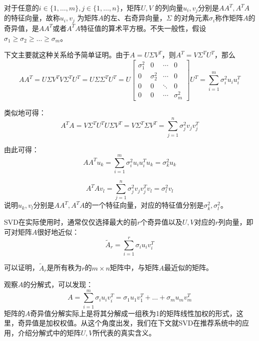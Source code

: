 对于任意的$i\in\{1,\ldots,m\},j\in\{1,\ldots,n\}$，矩阵$U,V$ 的列向量$u_i,v_j$分别是$AA^T,A^TA$ 的特征向量，故称$u_i,v_j$ 为矩阵$A$的左、右奇异向量，$\Sigma$ 的对角元素$\sigma_i$称作矩阵$A$的奇异值，是$AA^T$或者$A^TA$特征值的算术平方根。不失一般性，假设$\sigma_1 \ge \sigma_2 \ge \ldots \ge \sigma_m$。

下文主要就这种关系给予简单证明。由于$A = U\Sigma V^T$，则$A^T = V\Sigma^T U^T$，那么
\begin{equation}
  A A^T = U\Sigma V^T V\Sigma^T U^T = U\Sigma\Sigma^T U^T =
U
\begin{bmatrix}
\sigma_1^2 & 0 & \cdots & 0\\
0 & \sigma_2^2 & \cdots & 0\\
0 & 0 & \ddots & 0\\
0 & 0 & \cdots & \sigma_m^2
\end{bmatrix}
U^T = \sum_{i=1}^m{\sigma_i^2 u_iu_i^T}
\end{equation}

类似地可得：
\begin{equation}
  A^T A = V\Sigma^T U^T U\Sigma V^T = V\Sigma^T \Sigma V^T = \sum_{j=1}^n{\sigma_j^2 v_jv_j^T}
\end{equation}

由此可得：
\begin{equation}
  A A^T u_k = \sum_{i=1}^m{\sigma_i^2 u_iu_i^T} u_k = \sigma_k^2 u_k
\end{equation}

\begin{equation}
  A^T A v_l = \sum_{j=1}^n{\sigma_j^2 v_jv_j^T} v_l = \sigma_l^2 v_l
\end{equation}
说明$u_k, v_l$分别是$AA^T,A^TA$的一个特征向量，对应的特征值分别是$\sigma_k^2,\sigma_l^2$。

SVD在实际使用时，通常仅仅选择最大的前$r$个奇异值以及$U,V$对应的$r$列向量，即可对矩阵$A$很好地近似：
\begin{equation}\label{eq:approxsvd}
    \tilde{A}_r = \sum_{i=1}^r{\sigma_i u_i v_i^T}
\end{equation}

可以证明，$\tilde{A}_r$是所有秩为$r$的$m\times n$矩阵中，与矩阵$A$最近似的矩阵。

观察$A$的分解式，可以发现：
\begin{equation}
    A = \sum_{i=1}^m{\sigma_i u_i v_i^T} = \sigma_1 u_1 v_1^T + \ldots + \sigma_m u_m v_m^T
\end{equation}
矩阵的$A$奇异值分解实际上是将其分解成一组秩为1的矩阵线性加权的形式，这里，奇异值是加权权值。从这个角度出发，我们在下文就SVD在推荐系统中的应用，介绍分解式中的矩阵$U,V$所代表的真实含义。

